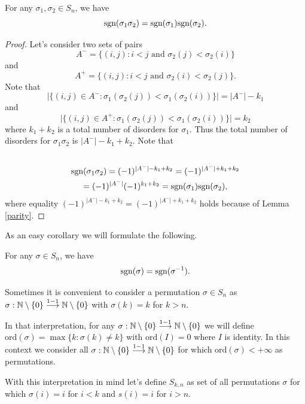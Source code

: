 \documentclass[main.tex]{subfiles}
\begin{document}
\begin{theorem}
For any $\sigma_1, \sigma_2\in S_n$, we have
\begin{equation}
\text{sgn}(\sigma_1\sigma_2) = \text{sgn}(\sigma_1)\text{sgn}(\sigma_2).
\end{equation}
\begin{proof}
Let's consider two sets of pairs $$A^{-} = \{(i, j): i < j \text{ and } \sigma_2(j) < \sigma_2(i)\}$$ and 
$$A^{+} = \{(i, j): i < j \text{ and } \sigma_2(i) < \sigma_2(j)\}.$$
Note that
$$\bigg|\{(i, j)\in A^{-}: \sigma_1(\sigma_2(j)) < \sigma_1(\sigma_2(i)) \}\bigg| = |A^-| - k_1$$
and
$$\bigg|\{(i, j)\in A^{+}: \sigma_1(\sigma_2(j)) < \sigma_1(\sigma_2(i)) \}\bigg| = k_2$$  
where $k_1 + k_2$ is a total number of disorders for $\sigma_1$. Thus the total number of disorders for $\sigma_1\sigma_2$ is $|A^-| - k_1 + k_2$.
Note that
\begin{multline*}
\\
\text{sgn}(\sigma_1\sigma_2) = (-1)^{|A^-| - k_1 + k_2} = (-1)^{|A^-| + k_1 + k_2} 
\\= (-1)^{|A^-|}(-1)^{k_1 + k_2} = \text{sgn}(\sigma_1)\text{sgn}(\sigma_2),\\
\end{multline*}
where equality $(-1)^{|A^-| - k_1 + k_2} = (-1)^{|A^-| + k_1 + k_2} $ holds because of Lemma \ref{parity}.
\end{proof}

As an easy corollary we will formulate the following.

\begin{theorem}
For any $\sigma \in S_n$, we have
\begin{equation}
\text{sgn}(\sigma) = \text{sgn}(\sigma^{-1}).
\end{equation}
\end{theorem}
\end{theorem}

Sometimes it is convenient to consider a permutation 
$\sigma\in S_n$ as $\sigma:\mathbb{N}\setminus \{0\} \overset{1-1}{\longrightarrow} \mathbb{N}\setminus \{0\}$ with $\sigma(k) = k$ for $k > n$.

In that interpretation, for any $\sigma:\mathbb{N}\setminus \{0\} \overset{1-1}{\longrightarrow} \mathbb{N}\setminus \{0\}$ we will define $\text{ord}(\sigma) = \max\{k: \sigma(k)\not = k\}$ with $\text{ord}(I)=0$ where $I$ is identity. In this context we consider all $\sigma:\mathbb{N}\setminus \{0\} \overset{1-1}{\longrightarrow} \mathbb{N}\setminus \{0\}$ for which $\text{ord}(\sigma) < +\infty$ as permutations.

With this interpretation in mind let's define $S_{k, n}$ as set of all permutations $\sigma$ for which $\sigma(i) = i$ for $i < k$ and $s(i) = i$ for $i > n$. 
\end{document}
